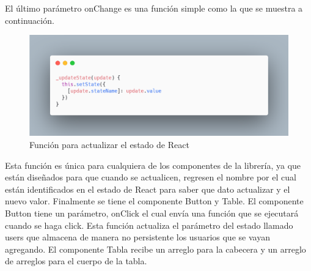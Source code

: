 El último parámetro onChange es una función simple como la que se muestra a continuación. 

\newline
\begin{figure}[H]
    \includegraphics[width=1\textwidth]{./Imagenes/9.9}
   \centering 
    \caption[Función para actualizar el estado de React]{Función para actualizar el estado de React}
    \end{figure}
\newline

Esta función es única para cualquiera de los componentes de la librería, ya que están diseñados para que cuando se actualicen, regresen el nombre por el cual están identificados en el estado de React para saber que dato actualizar  y el nuevo valor.
Finalmente se tiene el componente Button y Table. El componente Button tiene un parámetro, onClick el cual envía una función que se ejecutará cuando se haga click. Esta función actualiza el parámetro del estado llamado users que almacena de manera no persistente los usuarios que se vayan agregando.
El componente Tabla recibe un arreglo para la cabecera y un arreglo de arreglos para el cuerpo de la tabla.


